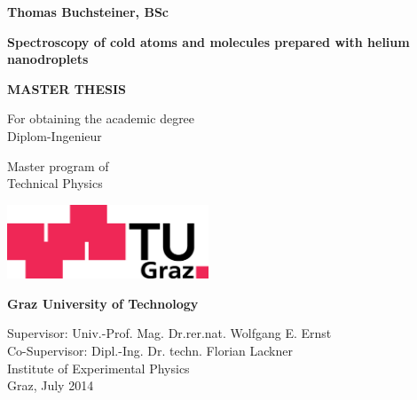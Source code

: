 \documentclass[parskip,12pt,headsepline,a4paper] {scrbook}
\begin{document}
\begin{titlepage}
\begin{center}
{\large \textbf{Thomas Buchsteiner, BSc}}

\vspace{1.5cm}

\begin{Large}
\textbf{Spectroscopy of cold atoms and molecules prepared with helium nanodroplets}
\end{Large}

\vspace{1cm}

{\Large \textbf{MASTER THESIS}}

\vspace{0.5cm}

For obtaining the academic degree \\
Diplom-Ingenieur

\vspace{0.5cm}

Master program of \\
Technical Physics

\vspace{2cm}

\includegraphics[width=6cm]{logo_tugraz.jpg}

\textbf{Graz University of Technology}

\vspace{1.5cm}

Supervisor: Univ.-Prof. Mag. Dr.rer.nat. Wolfgang E. Ernst \\
Co-Supervisor: Dipl.-Ing. Dr. techn. Florian Lackner\\
\vspace{0.5cm}
Institute of Experimental Physics\\
\vspace{1cm}
Graz, July 2014

\end{center}
\end{titlepage}

\frontmatter
\end{document}
